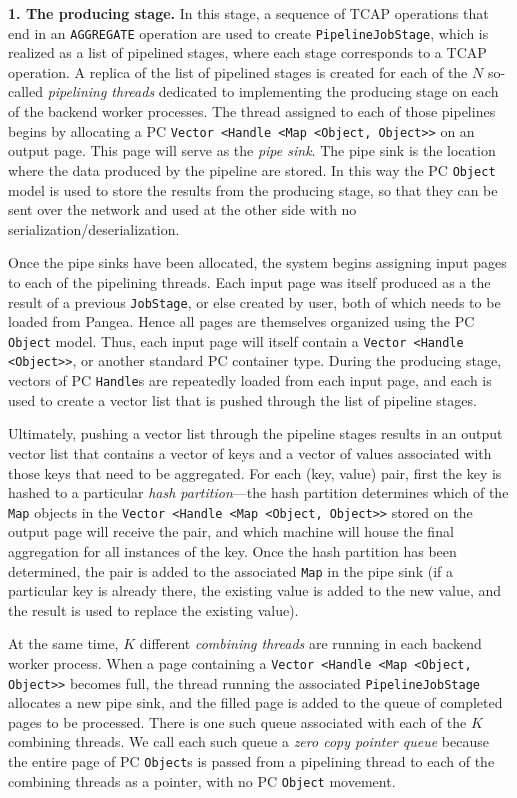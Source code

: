 \vspace{5pt}
{\bf 1. The producing stage.} In this stage, a sequence of TCAP
operations that end in an \texttt{AGGREGATE} operation are used to
create \texttt{PipelineJobStage}, which is 
realized as a list
of pipelined stages, where each stage corresponds to a TCAP operation.
A replica of the list of pipelined stages is
created for each of the $N$ so-called \emph{pipelining threads} dedicated to implementing
the producing stage on each of the backend worker processes.  
The thread assigned to each of those pipelines begins by allocating a PC \texttt{Vector <Handle <Map <Object, Object>>} on an output page.  This page will serve
as the \emph{pipe sink}.  The pipe sink is
the location where the data produced by the pipeline are stored.  In this way the PC \texttt{Object} model is used to store the results
from the producing stage, so that they can be sent over the network and used at the other side with no serialization/deserialization.

Once the pipe sinks have been allocated,
the system begins assigning input pages to each of the pipelining 
threads.  Each input page was itself produced as a the result of a
previous \texttt{JobStage}, or else created by user, both of which needs to be
loaded from Pangea.  Hence all pages are themselves organized using the PC \texttt{Object} model.  Thus, each input
page will itself contain a \texttt{Vector <Handle <Object>>},
or another standard PC container type.  During the producing stage, vectors of PC \texttt{Handle}s are repeatedly
loaded from each input page, and each is used to create a vector list that is pushed through the list of pipeline stages.

Ultimately, pushing a vector list through the pipeline stages results in an output vector list that contains a vector of keys and a vector of values 
associated with those keys that need to be aggregated.  
For each (key, value)
pair, first the key is hashed to a particular \emph{hash partition}---the hash partition determines which of the \texttt{Map}
objects in the \texttt{Vector <Handle <Map <Object, Object>>} stored on the output page will receive the pair, and which machine will house the final aggregation
for all instances of the key.  Once the hash partition has been determined,
the pair is added to the associated \texttt{Map} in the pipe sink
(if a particular key is already there, the
existing value is added to the new value, and the result is used to replace the existing value).  

At the same time, 
$K$ different \emph{combining threads} are running in each backend worker process.  
When a page containing a \texttt{Vector <Handle <Map <Object,
  Object>>} becomes full, the thread running the associated
\texttt{PipelineJobStage} allocates a new pipe sink,
and the filled page is added to the queue of completed pages to be processed.  There is one such queue
associated with each of the $K$ combining threads.
We call each such queue a \emph{zero copy pointer queue} because the entire page of PC \texttt{Object}s is passed from a pipelining thread to each of the
combining threads as a pointer, with no PC \texttt{Object} movement.

